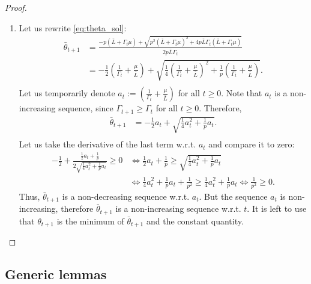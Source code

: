 \documentclass{article} %
\theoremstyle{plain}
\theoremstyle{definition}
\theoremstyle{remark}
\newcommand{\eqdef}{:=}
\begin{document}
\begin{proof}
\begin{enumerate}
\begin{align*}
\begin{cases}
    \frac{1}{4 p \theta_{\min}^2} + \frac{p (t - \bar{t})^2}{16}, &t \geq \bar{t}.
  \end{cases}
\end{align*}
\item
Let us rewrite \eqref{eq:theta_sol}:
\begin{align*}
  \bar{\theta}_{t+1} &= \frac{-p (\bar{L} + \Gamma_t \mu) + \sqrt{p^2 (\bar{L} + \Gamma_t \mu)^2 + 4 p \bar{L} \Gamma_t (\bar{L} + \Gamma_t \mu)}}{2 p \bar{L} \Gamma_t} \\
  &= -\frac{1}{2} \left(\frac{1}{\Gamma_t} + \frac{\mu}{\bar{L}}\right) + \sqrt{\frac{1}{4} \left(\frac{1}{\Gamma_t} + \frac{\mu}{\bar{L}}\right)^2 + \frac{1}{p} \left(\frac{1}{\Gamma_t} + \frac{\mu}{\bar{L}}\right)}. \\
\end{align*}
Let us temporarily denote $a_t \eqdef \left(\frac{1}{\Gamma_t} + \frac{\mu}{\bar{L}}\right)$ for all $t \geq 0.$ Note that $a_t$ is a non-increasing sequence, since $\Gamma_{t+1} \geq \Gamma_{t}$ for all $t \geq 0.$ Therefore,
\begin{align*}
  \bar{\theta}_{t+1} &= -\frac{1}{2} a_t + \sqrt{\frac{1}{4} a_t^2 + \frac{1}{p} a_t}. \\
\end{align*}
Let us take the derivative of the last term w.r.t. $a_t$ and compare it to zero:
\begin{align*}
  -\frac{1}{2} + \frac{\frac{1}{2} a_t + \frac{1}{p}}{2 \sqrt{\frac{1}{4} a_t^2 + \frac{1}{p} a_t}} \geq 0 &\Leftrightarrow \frac{1}{2} a_t + \frac{1}{p} \geq \sqrt{\frac{1}{4} a_t^2 + \frac{1}{p} a_t} \\
  &\Leftrightarrow \frac{1}{4} a_t^2 + \frac{1}{p} a_t + \frac{1}{p^2} \geq \frac{1}{4} a_t^2 + \frac{1}{p} a_t \Leftrightarrow \frac{1}{p^2} \geq 0.
\end{align*}
Thus, $\bar{\theta}_{t+1}$ is a non-decreasing sequence w.r.t. $a_t.$ But the sequence $a_t$ is non-increasing, therefore $\bar{\theta}_{t+1}$ is a non-increasing sequence w.r.t. $t.$ It is left to use that $\theta_{t+1}$ is the minimum of $\bar{\theta}_{t+1}$ and the constant quantity.
\end{enumerate}
\end{proof}

\subsection{Generic lemmas}
\end{document}
